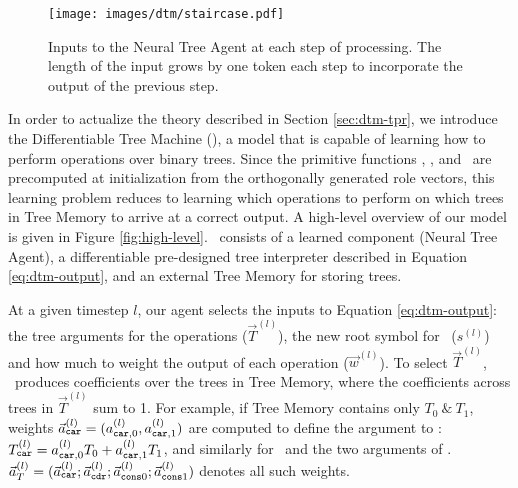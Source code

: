\begin{figure}[ht]
\vskip 0.2in
\begin{center}
\centerline{\texttt{[image: images/dtm/staircase.pdf]}}
\caption{Inputs to the Neural Tree Agent at each step of processing. The length of the input grows by one token each step to incorporate the output of the previous step.}
\label{step}
\end{center}
\vskip -0.2in
\end{figure}

In order to actualize the theory described in Section \ref{sec:dtm-tpr}, we introduce the Differentiable Tree Machine (\blackboard), a model that is capable of learning how to perform operations over binary trees. Since the primitive functions \car, \cdr, and \cons\ are precomputed at initialization from the orthogonally generated role vectors, this learning problem reduces to learning which operations to perform on which trees in Tree Memory to arrive at a correct output. A high-level overview of our model is given in Figure \ref{fig:high-level}. \blackboard\ consists of a learned component (Neural Tree Agent), a differentiable pre-designed tree interpreter described in Equation \ref{eq:dtm-output}, and an external Tree Memory for storing trees.

At a given timestep $l$, our agent selects the inputs to Equation \ref{eq:dtm-output}: the tree arguments for the operations ($\vec{T}^{(l)}$), the new root symbol for \cons\ ($s^{(l)}$) and how much to weight the output of each operation ($\vec{w}^{(l)}$). To select $\vec{T}^{(l)}$, \blackboard\ produces coefficients over the trees in Tree Memory, where the coefficients across trees in $\vec{T}^{(l)}$ sum to 1. For example, if Tree Memory contains only $T_0\ \&\  T_1$, weights $\vec{a}^{(l)}_{\texttt{car}} = (a^{(l)}_{\texttt{car},0}, a^{(l)}_{\texttt{car},1})$ are computed to define the argument to \car:
$T_{\texttt{car}}^{(l)}=a^{(l)}_{\texttt{car},0}T_0 + a^{(l)}_{\texttt{car},1}T_1$,
and similarly for \cdr\ and the two arguments of \cons.  $\vec{a}^{(l)}_{T}=(\vec{a}^{(l)}_{\texttt{car}};\vec{a}^{(l)}_{\texttt{cdr}};\vec{a}^{(l)}_{\texttt{cons} 0};\vec{a}^{(l)}_{\texttt{cons} 1})$ denotes all such weights.


